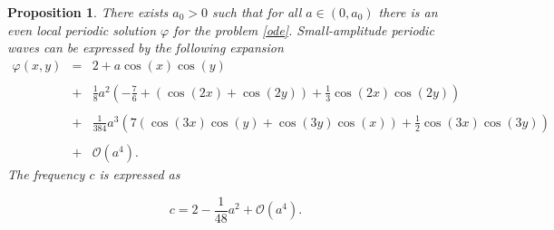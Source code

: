 \documentclass[12pt,reqno,a4paper]{amsart} %
\numberwithin{equation}{section}
\numberwithin{figure}{section}
\newtheorem{proposition}[theorem]{Proposition}
\begin{document}
			\begin{proposition}\label{propstokes1}
				There exists $a_0 > 0$ such that for all $a \in (0,a_0)$ there is an even local periodic solution $\varphi$ for the problem \eqref{ode}. Small-amplitude periodic waves can be expressed by the following expansion
				\begin{equation}\label{varphi-stokes31}\begin{array}{lllll}
					\varphi(x,y) &=&\displaystyle 2+a\cos(x)\cos(y)\\\\
					&+&\displaystyle\frac{1}{8}a^2\left(-\frac{7}{6}+\left(\cos(2x)+\cos(2y)\right)+\frac{1}{3}\cos(2x)\cos(2y)\right)\\\\
					&+&\displaystyle \frac{1}{384}a^3\left(7\left(\cos(3x)\cos(y)+\cos(3y)\cos(x)\right)+\frac{1}{2}\cos(3x)\cos(3y)\right)\\\\
					&+&\mathcal{O}(a^4).
				\end{array}\end{equation}
				The frequency $c$ is expressed as	
				
				\begin{equation}\label{varphi-stokes3}
					c = 2-\frac{1}{48}a^2+\mathcal{O}(a^4).
				\end{equation}
			\end{proposition}
			
\end{document}
